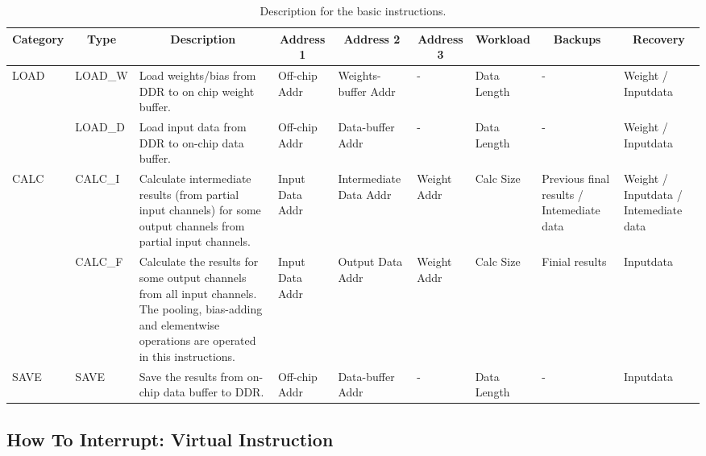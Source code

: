 \begin{table}[t]
	\footnotesize
	\centering
	\caption{Description for the basic instructions.}
\begin{tabular}{|p{2.7em}|p{3.4em}|p{16em}|p{4.2em}|p{4.6em}|p{4.2em}|p{4.2em}||p{7em}|p{7em}|}
	\hline
	\multicolumn{1}{|c|}{Category} & \multicolumn{1}{c|}{Type} & \multicolumn{1}{c|}{Description} & \multicolumn{1}{c|}{Address 1} & \multicolumn{1}{c|}{Address 2} & \multicolumn{1}{c|}{Address 3} & \multicolumn{1}{c||}{Workload} & \multicolumn{1}{c|}{Backups} & \multicolumn{1}{c|}{Recovery} \bigstrut\\
	\hline
	\multirow{2}[4]{*}{LOAD} & LOAD\_W & Load weights/bias from DDR to on chip weight buffer. & Off-chip Addr & Weights-buffer Addr & -     & Data  Length & -     & Weight / Inputdata \bigstrut\\
	\cline{2-9}\multicolumn{1}{|c|}{} & LOAD\_D & Load input data from DDR to on-chip data buffer. & Off-chip Addr & Data-buffer Addr & -     & Data  Length & -     & Weight / Inputdata \bigstrut\\
	\hline
	\multirow{2}[4]{*}{CALC} & CALC\_I & Calculate intermediate results (from partial input channels) for some output channels from partial  input channels. & Input  Data Addr & Intermediate Data Addr & Weight Addr & Calc Size & Previous final results / Intemediate data  & Weight / Inputdata /  Intemediate data \bigstrut\\
	\cline{2-9}\multicolumn{1}{|c|}{} & CALC\_F & Calculate the results for some output channels from all input channels. The pooling, bias-adding and elementwise operations are operated in this instructions. & Input  Data Addr & Output  Data Addr & Weight Addr & Calc Size & Finial results & Inputdata \bigstrut\\
	\hline
	SAVE  & SAVE  & Save the results from on-chip data buffer to DDR. & Off-chip Addr & Data-buffer Addr & -     & Data  Length & -     & Inputdata \bigstrut\\
	\hline
	\end{tabular}%
	
	\label{tab:instr}%
  \end{table}%




\subsection{How To Interrupt: Virtual Instruction}
\label{sec:howinter}

